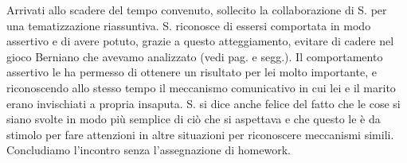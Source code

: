 \noindent Arrivati allo scadere del tempo convenuto, sollecito la collaborazione di S. per una tematizzazione riassuntiva.
S. riconosce di essersi comportata in modo assertivo e di avere potuto, grazie a questo atteggiamento, evitare di cadere nel gioco Berniano che avevamo analizzato (vedi pag. \pageref{s:incontro2} e segg.). Il comportamento assertivo le ha permesso di ottenere un risultato per lei molto importante, e riconoscendo allo stesso tempo il meccanismo comunicativo in cui lei e il marito erano invischiati a propria insaputa. S. si dice anche felice del fatto che le cose si siano svolte in modo più semplice di ciò che si aspettava e che questo le è da stimolo per fare attenzioni in altre situazioni per riconoscere meccanismi simili. Concludiamo l'incontro senza l'assegnazione di homework.
